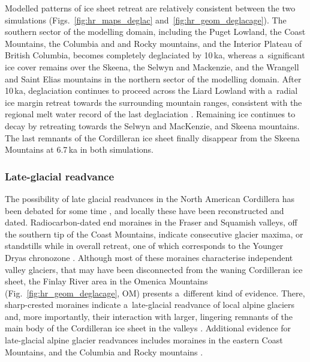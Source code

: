 \documentclass[tc, manuscript]{copernicus}
\begin{document}
      Modelled patterns of ice sheet retreat are relatively consistent
      between the two simulations (Figs.~\ref{fig:hr_maps_deglac}
      and~\ref{fig:hr_geom_deglacage}). The southern sector of the modelling
      domain, including the Puget Lowland, the Coast Mountains, the Columbia
      and and Rocky mountains, and the Interior Plateau of British Columbia,
      becomes completely deglaciated by 10\,\unit{ka}, whereas a~significant
      ice cover remains over the Skeena, the Selwyn and Mackenzie, and the
      Wrangell and Saint Elias mountains in the northern sector of the
      modelling domain. After 10\,\unit{ka}, deglaciation continues to
      proceed across the Liard Lowland with a~radial ice margin retreat
      towards the surrounding mountain ranges, consistent with the regional
      melt water record of the last deglaciation \citep{Margold.etal.2013}.
      Remaining ice continues to decay by retreating towards the Selwyn and
      MacKenzie, and Skeena mountains. The last remnants of the Cordilleran
      ice sheet finally disappear from the Skeena Mountains at
      6.7\,\unit{ka} in both simulations.

\subsubsection{Late-glacial readvance}

      The possibility of late glacial readvances in the North American
      Cordillera has been debated for some time \citep{Luckman.Osborn.1979,
      Reasoner.etal.1994, Osborn.Gerloff.1997, Osborn.etal.1995},
      and locally these have been reconstructed and dated. Radiocarbon-dated
      end moraines in the Fraser and Squamish valleys, off the southern tip
      of the Coast Mountains, indicate consecutive glacier maxima, or
      standstills while in overall retreat, one of which corresponds to the
      Younger Dryas chronozone \citep{Clague.etal.1997, Friele.Clague.2002,
      Friele.Clague.2002a, Kovanen.2002, Kovanen.Easterbrook.2002}. Although
      most of these moraines characterise independent valley glaciers, that
      may have been disconnected from the waning Cordilleran ice sheet, the
      Finlay River area in the Omenica Mountains
      (Fig.~\ref{fig:hr_geom_deglacage}, OM) presents a~different kind of
      evidence. There, sharp-crested moraines indicate a~late-glacial
      readvance of local alpine glaciers and, more importantly, their
      interaction with larger, lingering remnants of the main body of the
      Cordilleran ice sheet in the valleys \citep{Lakeman.etal.2008}.
      Additional evidence for late-glacial alpine glacier readvances
      includes moraines in the eastern Coast Mountains, and the Columbia and
      Rocky mountains \citep{Reasoner.etal.1994, Osborn.Gerloff.1997,
      Menounos.etal.2008}.
\end{document}
